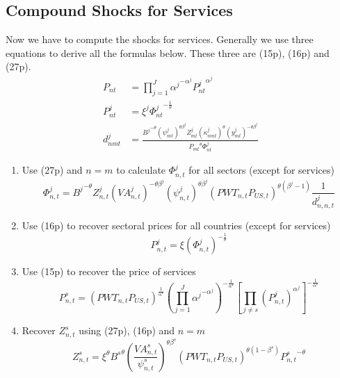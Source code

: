 \documentclass[11pt,oneside,a4paper]{article}
\begin{document}
\subsection{Compound Shocks for Services}
Now we have to compute the shocks for services. Generally we use three equations to derive all the formulas below. These three are (15p), (16p) and (27p).
%
\begin{align}
P_{nt} &= \prod_{j = 1}^J {\alpha^j}^{- \alpha^j} {P_{nt}^j}^{\alpha^j} \tag{15p}\\
%
P_{nt}^j &= \xi^j {\Phi_{nt}^j}^{-\frac{1}{\theta}} \tag{16p}\\
%
d^j_{nmt} &= \frac{{B^{j}}^{-\theta} \left(\psi^j_{mt}\right)^{\theta\beta^j} Z_{mt}^j \left(\kappa^j_{nmt}\right)^{\theta} \left(y^j_{mt}\right)^{-\theta\beta^j}}{{P_{mt}}^\theta {\Phi_{nt}^j}} \tag{27p}
\end{align}
%
\begin{enumerate}
  \item Use (27p) and $n = m$ to calculate $\Phi_{n, t}^j$ for all sectors (except for services)
  \begin{equation}
     \Phi_{n, t}^j = {B^j}^{-\theta} Z_{n, t}^j \left(VA^j_{n, t}\right)^{-\theta \beta^j} \left(\psi^j_{n, t}\right)^{\theta \beta^j}  \left(PWT_{n, t} P_{US, t}\right)^{\theta(\beta^j - 1)} \frac{1}{d_{n, n, t}^j}
  \end{equation} 
  \item Use (16p) to recover sectoral prices for all countries (except for services)
  \begin{equation}
    P_{n, t}^j = \xi \left(\Phi_{n,t}^j\right)^{-\frac{1}{\theta}}
  \end{equation}
  \item Use (15p) to recover the price of services
  \begin{equation}
    P_{n, t}^s = \left(PWT_{n, t} P_{US, t}\right)^{\frac{1}{\alpha^s}} \left(\prod_{j = 1}^J {\alpha^j}^{- \alpha^j}\right)^{-\frac{1}{\alpha^s}} \left[\prod_{j \neq s} \left(P_{n, t}^j\right)^{\alpha^j}\right]^{-\frac{1}{\alpha^s}}
  \end{equation}
  \item Recover $Z_{n, t}^s$ using (27p), (16p) and $n = m$
  \begin{equation}
    Z_{n, t}^s = \xi^\theta {B^s}^\theta \left(\frac{VA^s_{n, t}}{\psi^s_{n, t}}\right)^{\theta \beta^s} \left(PWT_{n, t} P_{US, t}\right)^{\theta(1 - \beta^s)} {P_{n, t}^s}^{-\theta}
  \end{equation}
\end{enumerate}
\end{document}
